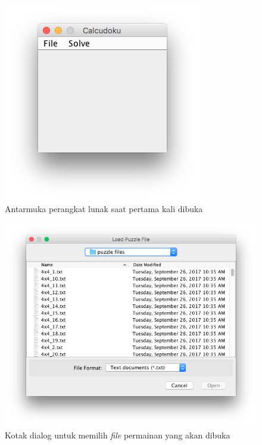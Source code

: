 \begin{figure}
\centering
\captionsetup{justification=centering}
\includegraphics[scale=0.5]{Gambar/ImplementasiPengujian/Calcudoku1.png}
\caption[Antarmuka perangkat lunak saat pertama kali dibuka]{Antarmuka perangkat lunak saat pertama kali dibuka}
\label{fig:antarmukapl1}
\end{figure}

\begin{figure}
\centering
\captionsetup{justification=centering}
\includegraphics[scale=0.5]{Gambar/ImplementasiPengujian/FileChooser.png}
\caption[Kotak dialog untuk memilih \textit{file} permainan yang akan dibuka]{Kotak dialog untuk memilih \textit{file} permainan yang akan dibuka}
\label{fig:antarmukapl2}
\end{figure}


